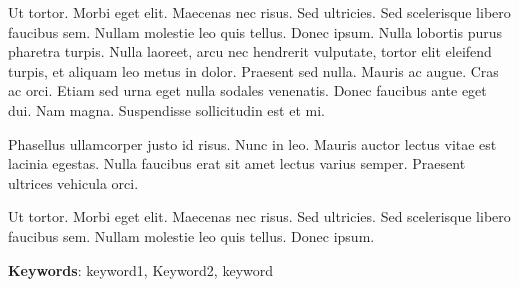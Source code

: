 Ut tortor. Morbi eget elit. Maecenas nec risus. Sed ultricies. Sed
scelerisque libero faucibus sem. Nullam molestie leo quis
tellus. Donec ipsum. Nulla lobortis purus pharetra turpis. Nulla
laoreet, arcu nec hendrerit vulputate, tortor elit eleifend turpis, et
aliquam leo metus in dolor. Praesent sed nulla. Mauris ac augue. Cras
ac orci. Etiam sed urna eget nulla sodales venenatis. Donec faucibus
ante eget dui. Nam magna. Suspendisse sollicitudin est et mi. 

Phasellus ullamcorper justo id risus. Nunc in leo. Mauris auctor
lectus vitae est lacinia egestas. Nulla faucibus erat sit amet lectus
varius semper. Praesent ultrices vehicula orci. 

Ut tortor. Morbi eget elit. Maecenas nec risus. Sed ultricies. Sed
scelerisque libero faucibus sem. Nullam molestie leo quis
tellus. Donec ipsum. 

\vspace*{10mm}\noindent
\textbf{Keywords}: keyword1, Keyword2, keyword